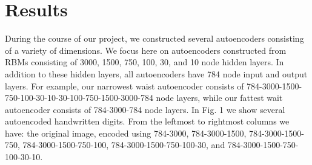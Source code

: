 \documentclass{article}
\begin{document}
\section{Results}\label{sec:results}

During the course of our project, we constructed several autoencoders consisting of a variety of dimensions. We focus here on autoencoders constructed from RBMs consisting of 3000, 1500, 750, 100, 30, and 10 node hidden layers. In addition to these hidden layers, all autoencoders have 784 node input and output layers. For example, our narrowest waist autoencoder consists of 784-3000-1500-750-100-30-10-30-100-750-1500-3000-784 node layers, while our fattest wait autoencoder consists of 784-3000-784 node layers. In Fig. 1 we show several autoencoded handwritten digits. From the leftmost to rightmost columns we have: the original image, encoded using 784-3000, 784-3000-1500, 784-3000-1500-750, 784-3000-1500-750-100, 784-3000-1500-750-100-30, and 784-3000-1500-750-100-30-10.
\end{document}
